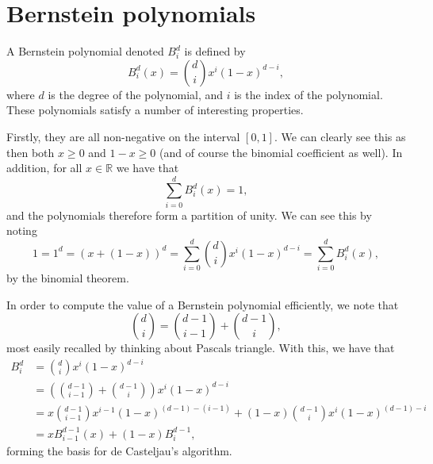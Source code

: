 \section{Bernstein polynomials}

A Bernstein polynomial denoted $B_i^d$ is defined by
\begin{equation}
    B_i^d(x) = \binom{d}{i} x^i (1 - x)^{d - i},
\end{equation}
where $d$ is the degree of the polynomial, and $i$ is the index of the polynomial.
These polynomials satisfy a number of interesting properties.

Firstly, they are all non-negative on the interval $[0, 1]$.
We can clearly see this as then both $x \geq 0$ and $1 - x \geq 0$ (and of course the binomial coefficient as well).
In addition, for all $x \in \mathbb{R}$ we have that
\begin{equation}
    \sum_{i = 0}^{d} B_i^d(x) = 1,
\end{equation}
and the polynomials therefore form a partition of unity.
We can see this by noting
\begin{equation}
    1
    = 1^d
    = (x + (1 - x))^d
    = \sum_{i = 0}^{d} \binom{d}{i} x^i (1 - x)^{d - i}
    = \sum_{i = 0}^{d} B_i^d(x),
\end{equation}
by the binomial theorem.

In order to compute the value of a Bernstein polynomial efficiently, we note that
\begin{equation}
    \binom{d}{i} = \binom{d - 1}{i - 1} + \binom{d - 1}{i},
\end{equation}
most easily recalled by thinking about Pascals triangle.
With this, we have that
\begin{align*}
    B_{i}^{d}
    &= \binom{d}{i} x^i (1 - x)^{d - i} \\
    &= \left(\binom{d - 1}{i - 1} + \binom{d - 1}{i}\right) x^i (1 - x)^{d - i} \\
    &= x \binom{d - 1}{i - 1} x^{i - 1} (1 - x)^{(d - 1) - (i - 1)} + (1 - x) \binom{d - 1}{i} x^i (1 - x)^{(d - 1) - i} \\
    &= x B_{i - 1}^{d - 1}(x) + (1 - x)B_{i}^{d - 1},
\end{align*}
forming the basis for de Casteljau's algorithm.
